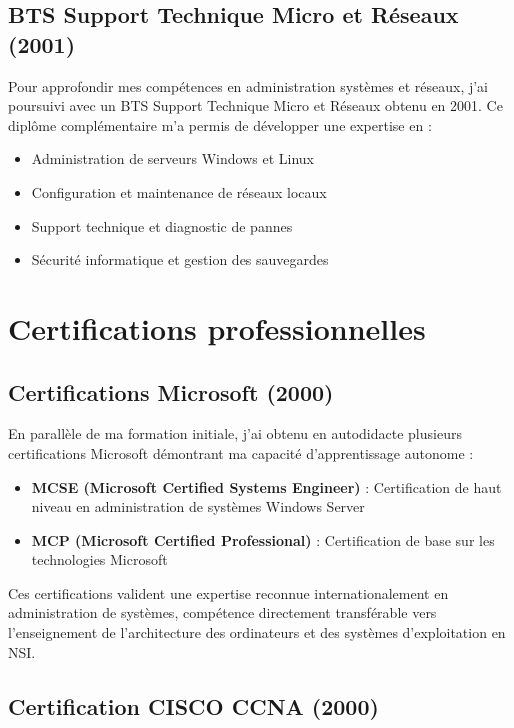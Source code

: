 \subsection{BTS Support Technique Micro et Réseaux (2001)}

Pour approfondir mes compétences en administration systèmes et réseaux, j'ai poursuivi avec un BTS Support Technique Micro et Réseaux obtenu en 2001. Ce diplôme complémentaire m'a permis de développer une expertise en :

\begin{itemize}[leftmargin=*]
    \item Administration de serveurs Windows et Linux
    \item Configuration et maintenance de réseaux locaux
    \item Support technique et diagnostic de pannes
    \item Sécurité informatique et gestion des sauvegardes
\end{itemize}

\section{Certifications professionnelles}

\subsection{Certifications Microsoft (2000)}

En parallèle de ma formation initiale, j'ai obtenu en autodidacte plusieurs certifications Microsoft démontrant ma capacité d'apprentissage autonome :

\begin{itemize}[leftmargin=*]
    \item \textbf{MCSE (Microsoft Certified Systems Engineer)} : Certification de haut niveau en administration de systèmes Windows Server
    \item \textbf{MCP (Microsoft Certified Professional)} : Certification de base sur les technologies Microsoft
\end{itemize}

Ces certifications valident une expertise reconnue internationalement en administration de systèmes, compétence directement transférable vers l'enseignement de l'architecture des ordinateurs et des systèmes d'exploitation en NSI.

\subsection{Certification CISCO CCNA (2000)}

